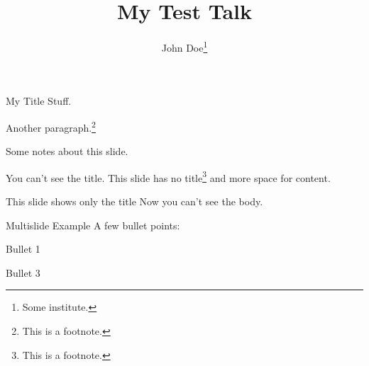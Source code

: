 \documentclass[12pt,screen]{talk}
\title{My Test Talk}
\author[John Doe]{John Doe\thanks{Some institute.}}
\begin{document}
\maketitleslide

\begin{slide}{My Title}
  Stuff.

  Another paragraph.\footnote{This is a footnote.}
\end{slide}

\begin{notes}
  Some notes about this slide.
\end{notes}

\begin{slide}[notitle]{You can't see the title.}
  This slide has no title\footnote{This is a footnote.} and more space for
  content.
\end{slide}

\begin{slide}[onlytitle]{This slide shows only the title}
  Now you can't see the body.
\end{slide}

\begin{multislide}{3}{Multislide Example}
  A few bullet points:
  \begin{itemize}
  \item Bullet 1
  {\item Bullet 3}
  \end{itemize}
\end{multislide}
\end{document}
